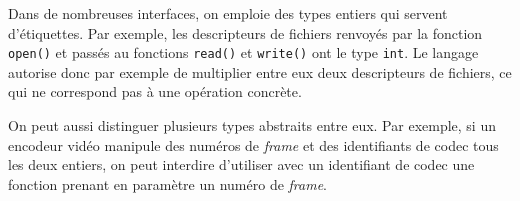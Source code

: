Dans de nombreuses interfaces, on emploie des types entiers qui servent
d'étiquettes. Par exemple, les descripteurs de fichiers renvoyés par la fonction
\verb!open()! et passés au fonctions \verb!read()! et \verb!write()! ont
le type \texttt{int}. Le langage autorise donc par exemple de multiplier entre
eux deux descripteurs de fichiers, ce qui ne correspond pas à une opération
concrète.

On peut aussi distinguer plusieurs types abstraits entre eux. Par exemple, si un
encodeur vidéo manipule des numéros de \emph{frame} et des identifiants de codec
tous les deux entiers, on peut interdire d'utiliser avec un identifiant de codec
une fonction prenant en paramètre un numéro de \emph{frame}.


